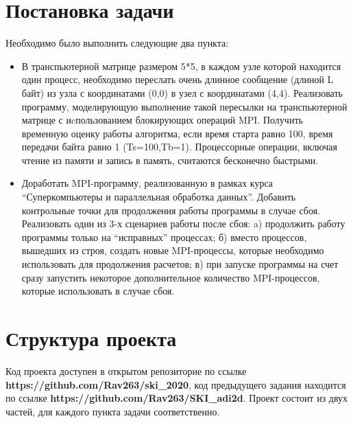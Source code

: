 \documentclass[a4peper, 12pt, titlepage, finall]{extreport}
\begin{document}
    \section{Постановка задачи}
        Необходимо было выполнить следующие два пункта:
        \begin{itemize}
            \item  В транспьютерной матрице размером 5*5, в каждом узле которой находится один процесс, необходимо переслать очень длинное сообщение 
                (длиной L байт) из узла с координатами (0,0) в узел с координатами (4,4). Реализовать программу, моделирующую выполнение такой пересылки 
                на транспьютерной матрице с иcпользованием блокирующих операций MPI. Получить временную оценку работы алгоритма, 
                если время старта равно 100, время передачи байта равно 1 (Ts=100,Tb=1). Процессорные операции, включая чтение из памяти и запись в память, считаются бесконечно быстрыми.
            \item Доработать MPI-программу, реализованную в рамках курса “Суперкомпьютеры и параллельная обработка данных”. Добавить контрольные точки 
                для продолжения работы программы в случае сбоя. Реализовать один из 3-х сценариев работы после сбоя: a) продолжить работу 
                программы только на “исправных” процессах; б) вместо процессов, вышедших из строя, создать новые MPI-процессы, которые необходимо использовать 
                для продолжения расчетов; в) при запуске программы на счет сразу запустить некоторое дополнительное количество MPI-процессов, которые использовать в случае сбоя.
        \end{itemize}
        \section{Структура проекта}
            Код проекта доступен в открытом репозиторие по ссылке \textbf{https://github.com/Rav263/ski\_2020}, код предыдущего задания находится по ссылке 
            \textbf{https://github.com/Rav263/SKI\_adi2d}. Проект состоит из двух частей, для каждого пункта задачи соответственно.
                \begin{flushleft}
            \end{flushleft}
\end{document}
